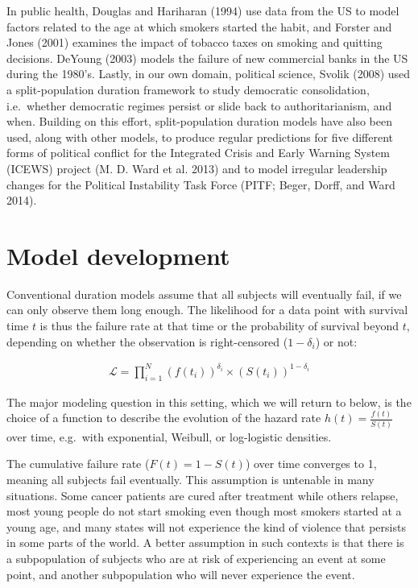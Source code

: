 \documentclass[article]{jss}
\begin{document}
In public health, Douglas and Hariharan (1994) use data from the US to
model factors related to the age at which smokers started the habit, and
Forster and Jones (2001) examines the impact of tobacco taxes on smoking
and quitting decisions. DeYoung (2003) models the failure of new
commercial banks in the US during the 1980's. Lastly, in our own domain,
political science, Svolik (2008) used a split-population duration
framework to study democratic consolidation, i.e.~whether democratic
regimes persist or slide back to authoritarianism, and when. Building on
this effort, split-population duration models have also been used, along
with other models, to produce regular predictions for five different
forms of political conflict for the Integrated Crisis and Early Warning
System (ICEWS) project (M. D. Ward et al. 2013) and to model irregular
leadership changes for the Political Instability Task Force (PITF;
Beger, Dorff, and Ward 2014).

\section{Model development}\label{model-development}

Conventional duration models assume that all subjects will eventually
fail, if we can only observe them long enough. The likelihood for a data
point with survival time \(t\) is thus the failure rate at that time or
the probability of survival beyond \(t\), depending on whether the
observation is right-censored (\(1-\delta_i\)) or not:

\begin{eqnarray}
\mathcal{L} = \prod_{i=1}^N  \left( f(t_i)\right)^{\delta_i} \times \left( S(t_i) \right)^{1-\delta_i}
\end{eqnarray}

The major modeling question in this setting, which we will return to
below, is the choice of a function to describe the evolution of the
hazard rate \(h(t) = \frac{f(t)}{S(t)}\) over time, e.g.~with
exponential, Weibull, or log-logistic densities.

The cumulative failure rate (\(F(t) = 1 - S(t)\)) over time converges to
1, meaning all subjects fail eventually. This assumption is untenable in
many situations. Some cancer patients are cured after treatment while
others relapse, most young people do not start smoking even though most
smokers started at a young age, and many states will not experience the
kind of violence that persists in some parts of the world. A better
assumption in such contexts is that there is a subpopulation of subjects
who are at risk of experiencing an event at some point, and another
subpopulation who will never experience the event.
\end{document}
